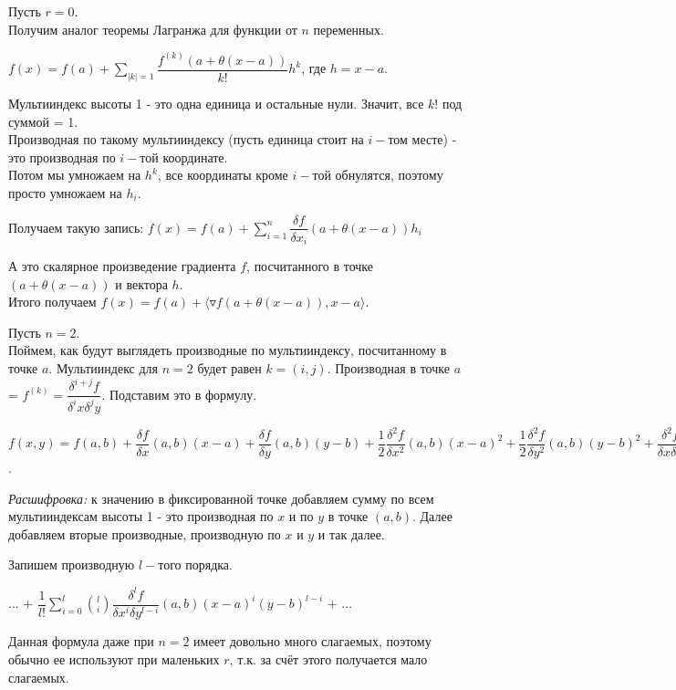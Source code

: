 \begin{example} \thmslashn
	
	Пусть $r = 0.$
	\\ Получим аналог теоремы Лагранжа для функции от $n$ переменных.
	
	$f(x) = f(a) + \sum\limits_{|k| = 1}\dfrac{f^{(k)}(a + \theta(x - a))}{k!}h^k$, где $h = x - a$.
	
	Мультииндекс высоты 1 - это одна единица и  остальные нули. Значит, все $k!$ под суммой = 1. \\ Производная по такому мультииндексу (пусть единица стоит на $i-$том месте) - это производная по $i-$той координате. \\ Потом мы умножаем на $h^k$, все координаты кроме $i-$той обнулятся, поэтому просто умножаем на $h_i$.
	
	Получаем такую запись: $f(x) = f(a) + \sum\limits_{i = 1}^{n}\dfrac{\delta f}{\delta x_i}(a + \theta(x - a))h_i$
	
	А это скалярное произведение градиента $f$, посчитанного в точке $(a + \theta(x - a))$ и вектора $h$.
	\\ Итого получаем $ f(x) = f(a) + \langle \triangledown f(a + \theta(x - a)), x - a \rangle$.
	
\end{example}

\begin{example} \thmslashn
	
	Пусть $n = 2$.\\
	Поймем, как будут выглядеть производные по мультииндексу, посчитанному в точке $a$. Мультииндекс для $n = 2$ будет равен $k = (i, j).$ Производная в точке $a$ = $f^{(k)} = \dfrac{\delta^{i + j}f}{\delta^ix \delta^jy}$. Подставим это в формулу.
	
	$f(x, y) = f(a, b) + \dfrac{\delta f}{\delta x}(a, b)(x - a) + \dfrac{\delta f}{\delta y}(a, b)(y - b) + \dfrac{1}{2}\dfrac{\delta^2 f}{\delta x^2}(a, b)(x - a)^2 + \dfrac{1}{2}\dfrac{\delta^2 f}{\delta y^2}(a, b)(y - b)^2 + 
	\dfrac{\delta^2 f}{\delta x \delta y}(a, b)(x - a)(y - b) + ...$.
	
	\textit{Расшифровка:} к значению в фиксированной точке добавляем сумму по всем мультииндексам высоты 1 - это производная по $x$ и по $y$ в точке $(a, b)$. Далее добавляем вторые производные, производную по $x$ и $y$ и так далее.
	
	Запишем производную $l-$того порядка.
	
	... + $\dfrac{1}{l!}\sum\limits_{i = 0}^{l} {l\choose i} \dfrac{\delta^{l}f}{\delta x^i \delta y^{l - i}}(a, b) (x - a)^i (y - b)^{l - i}$ + ...
	
	Данная формула даже при $n = 2$ имеет довольно много слагаемых, поэтому обычно ее используют при маленьких $r$, т.к. за счёт этого получается мало слагаемых.
	
\end{example}